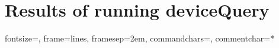 \section{Results of running deviceQuery}\label{app:deviceQuery}
%
{fontsize=\footnotesize,
 frame=lines,  %
 framesep=2em, %
 commandchars=\|\(\), %
 commentchar=*        %
}
